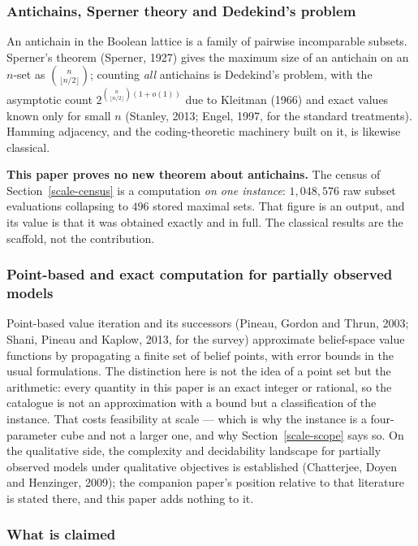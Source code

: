 \documentclass[10pt,twocolumn]{article}
\theoremstyle{plain}
\theoremstyle{definition}
\theoremstyle{remark}
\begin{document}
\subsubsection{Antichains, Sperner theory and Dedekind's problem}

An antichain in the Boolean lattice is a family of pairwise incomparable subsets. Sperner's
theorem (Sperner, 1927) gives the maximum size of an antichain on an \(n\)-set as
\(\binom{n}{\lfloor n/2\rfloor}\); counting \emph{all} antichains is Dedekind's problem,
with the asymptotic count \(2^{\binom{n}{\lfloor n/2\rfloor}(1+o(1))}\) due to Kleitman
(1966) and exact values known only for small \(n\) (Stanley, 2013; Engel, 1997, for the
standard treatments). Hamming adjacency, and the coding-theoretic machinery built on it, is
likewise classical.

\textbf{This paper proves no new theorem about antichains.} The census of
Section~\ref{scale-census} is a computation \emph{on one instance}: \(1{,}048{,}576\) raw subset
evaluations collapsing to \(496\) stored maximal sets. That figure is an output, and its
value is that it was obtained exactly and in full. The classical results are the scaffold,
not the contribution.

\subsubsection{Point-based and exact computation for partially observed models}

Point-based value iteration and its successors (Pineau, Gordon and Thrun, 2003; Shani,
Pineau and Kaplow, 2013, for the survey) approximate belief-space value functions by
propagating a finite set of belief points, with error bounds in the usual formulations. The
distinction here is not the idea of a point set but the arithmetic: every quantity in this
paper is an exact integer or rational, so the catalogue is not an approximation with a
bound but a classification of the instance. That costs feasibility at scale --- which is why
the instance is a four-parameter cube and not a larger one, and why
Section~\ref{scale-scope} says so. On the qualitative side, the complexity and decidability
landscape for partially observed models under qualitative objectives is established
(Chatterjee, Doyen and Henzinger, 2009); the companion paper's position relative to that
literature is stated there, and this paper adds nothing to it.

\subsubsection{What is claimed}
\end{document}
